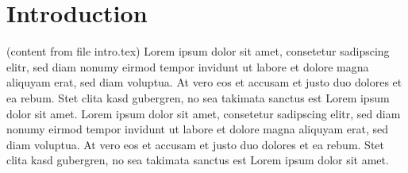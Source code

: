 

\section{Introduction} {
%
%
(content from file intro.tex)
\newline
\newline
Lorem ipsum dolor sit amet, consetetur sadipscing elitr, sed diam nonumy eirmod tempor invidunt ut labore et dolore magna aliquyam erat, sed diam voluptua. At vero eos et accusam et justo duo dolores et ea rebum. Stet clita kasd gubergren, no sea takimata sanctus est Lorem ipsum dolor sit amet. Lorem ipsum dolor sit amet, consetetur sadipscing elitr, sed diam nonumy eirmod tempor invidunt ut labore et dolore magna aliquyam erat, sed diam voluptua. At vero eos et accusam et justo duo dolores et ea rebum. Stet clita kasd gubergren, no sea takimata sanctus est Lorem ipsum dolor sit amet.
}

